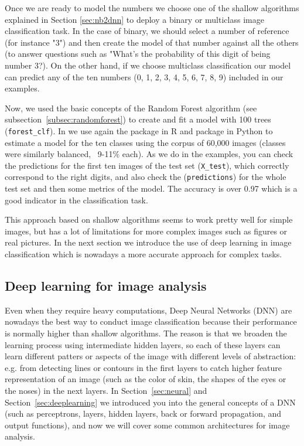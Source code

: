 
Once we are ready to model the numbers we choose one of the shallow algorithms explained in Section \ref{sec:nb2dnn} to deploy a binary or multiclass image classification task. In the case of binary, we should select a number of reference (for instance "3") and then create the model of that number against all the others (to answer questions such as "What's the probability of this digit of being number 3?). On the other hand, if we choose multiclass classification our model can predict any of the ten numbers (0, 1, 2, 3, 4, 5, 6, 7, 8, 9) included in our examples.

Now, we used the basic concepts of the Random Forest algorithm (see subsection~\ref{subsec:randomforest}) to create and fit a model with 100 trees (\texttt{forest\_clf}). In  we use again the  package in R and  package in Python to estimate a model for the ten classes using the corpus of 60,000 images (classes were similarly balanced, ~9-11\% each). As we do in the examples, you can check the predictions for the first ten images of the test set (\texttt{X\_test}), which correctly correspond to the right digits, and also check the (\texttt{predictions}) for the whole test set and then some metrics of the model. The accuracy is over 0.97 which is a good indicator in the classification task.


This approach based on shallow algorithms seems to work pretty well for simple images, but has a lot of limitations for more complex images such as figures or real pictures. In the next section we introduce the use of deep learning in image classification which is nowadays a more accurate approach for complex tasks.


\subsection{Deep learning for image analysis}
\label{subsec:deep}

Even when they require heavy computations, Deep Neural Networks (DNN) are nowadays the best way to conduct image classification because their performance is normally higher than shallow algorithms. The reason is that we broaden the learning process using intermediate hidden layers, so each of these layers can learn different patters or aspects of the image with different levels of abstraction: e.g. from detecting lines or contours in the first layers to catch higher feature representation of an image (such as the color of skin, the shapes of the eyes or the noses) in the next layers. In Section~\ref{sec:neural} and Section~\ref{sec:deeplearning} we introduced you into the general concepts of a DNN (such as perceptrons, layers, hidden layers, back or forward propagation, and output functions), and now we will cover some common architectures for image analysis.


